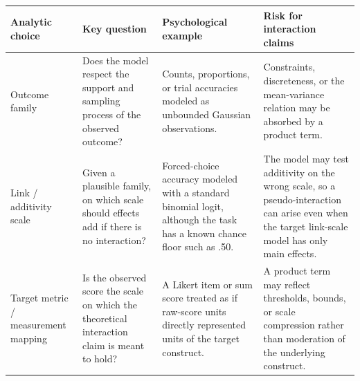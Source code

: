 \documentclass[
  man,
  longtable,
  nolmodern,
  notxfonts,
  notimes,
  colorlinks=true,linkcolor=blue,citecolor=blue,urlcolor=blue]{apa7}
\begin{document}
\begin{table}

{\caption{{Three analytic choices that determine the scale of an
interaction claim. The choices are conceptually distinct, but they can
overlap in applied analyses.}{\label{tbl-family-link-metric}}}
\vspace{-20pt}}

\begin{longtable}[]{@{}
  >{\raggedright\arraybackslash}p{}
  >{\raggedright\arraybackslash}p{}
  >{\raggedright\arraybackslash}p{}
  >{\raggedright\arraybackslash}p{}@{}}
\toprule\noalign{}
\begin{minipage}[b]{\linewidth}\raggedright
Analytic choice
\end{minipage} & \begin{minipage}[b]{\linewidth}\raggedright
Key question
\end{minipage} & \begin{minipage}[b]{\linewidth}\raggedright
Psychological example
\end{minipage} & \begin{minipage}[b]{\linewidth}\raggedright
Risk for interaction claims
\end{minipage} \\
\midrule\noalign{}
\endhead
\bottomrule\noalign{}
\endlastfoot
Outcome family & Does the model respect the support and sampling process
of the observed outcome? & Counts, proportions, or trial accuracies
modeled as unbounded Gaussian observations. & Constraints, discreteness,
or the mean-variance relation may be absorbed by a product term. \\
Link / additivity scale & Given a plausible family, on which scale
should effects add if there is no interaction? & Forced-choice accuracy
modeled with a standard binomial logit, although the task has a known
chance floor such as .50. & The model may test additivity on the wrong
scale, so a pseudo-interaction can arise even when the target link-scale
model has only main effects. \\
Target metric / measurement mapping & Is the observed score the scale on
which the theoretical interaction claim is meant to hold? & A Likert
item or sum score treated as if raw-score units directly represented
units of the target construct. & A product term may reflect thresholds,
bounds, or scale compression rather than moderation of the underlying
construct. \\
\end{longtable}

\end{table}
\end{document}
